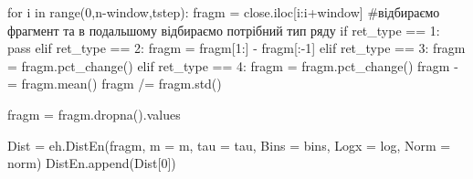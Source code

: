 \documentclass[
  letterpaper,
]{report}
\newenvironment{Shaded}{\begin{snugshade}}{\end{snugshade}}
\newcommand{\BuiltInTok}[1]{\textcolor[rgb]{0.00,0.23,0.31}{#1}}
\newcommand{\CommentTok}[1]{\textcolor[rgb]{0.37,0.37,0.37}{#1}}
\newcommand{\ControlFlowTok}[1]{\textcolor[rgb]{0.00,0.23,0.31}{#1}}
\newcommand{\DecValTok}[1]{\textcolor[rgb]{0.68,0.00,0.00}{#1}}
\newcommand{\KeywordTok}[1]{\textcolor[rgb]{0.00,0.23,0.31}{#1}}
\newcommand{\NormalTok}[1]{\textcolor[rgb]{0.00,0.23,0.31}{#1}}
\newcommand{\OperatorTok}[1]{\textcolor[rgb]{0.37,0.37,0.37}{#1}}
\begin{document}
\begin{Shaded}
\begin{Highlighting}[]
\ControlFlowTok{for}\NormalTok{ i }\KeywordTok{in} \BuiltInTok{range}\NormalTok{(}\DecValTok{0}\NormalTok{,n}\OperatorTok{{-}}\NormalTok{window,tstep):}
\NormalTok{    fragm }\OperatorTok{=}\NormalTok{ close.iloc[i:i}\OperatorTok{+}\NormalTok{window] }\CommentTok{\#відбираємо фрагмент та в подальшому відбираємо потрібний тип ряду}
    \ControlFlowTok{if}\NormalTok{ ret\_type }\OperatorTok{==} \DecValTok{1}\NormalTok{:}
        \ControlFlowTok{pass}
    \ControlFlowTok{elif}\NormalTok{ ret\_type }\OperatorTok{==} \DecValTok{2}\NormalTok{:}
\NormalTok{        fragm }\OperatorTok{=}\NormalTok{ fragm[}\DecValTok{1}\NormalTok{:] }\OperatorTok{{-}}\NormalTok{ fragm[:}\OperatorTok{{-}}\DecValTok{1}\NormalTok{]}
    \ControlFlowTok{elif}\NormalTok{ ret\_type }\OperatorTok{==} \DecValTok{3}\NormalTok{:}
\NormalTok{        fragm }\OperatorTok{=}\NormalTok{ fragm.pct\_change()}
    \ControlFlowTok{elif}\NormalTok{ ret\_type }\OperatorTok{==} \DecValTok{4}\NormalTok{:}
\NormalTok{        fragm }\OperatorTok{=}\NormalTok{ fragm.pct\_change()}
\NormalTok{        fragm }\OperatorTok{{-}=}\NormalTok{ fragm.mean()}
\NormalTok{        fragm }\OperatorTok{/=}\NormalTok{ fragm.std()}
        
\NormalTok{    fragm }\OperatorTok{=}\NormalTok{ fragm.dropna().values}
    
\NormalTok{    Dist }\OperatorTok{=}\NormalTok{ eh.DistEn(fragm, m }\OperatorTok{=}\NormalTok{ m, tau }\OperatorTok{=}\NormalTok{ tau, Bins }\OperatorTok{=}\NormalTok{ bins, Logx }\OperatorTok{=}\NormalTok{ log, Norm }\OperatorTok{=}\NormalTok{ norm)}
\NormalTok{    DistEn.append(Dist[}\DecValTok{0}\NormalTok{])}
\end{Highlighting}
\end{Shaded}
\end{document}
